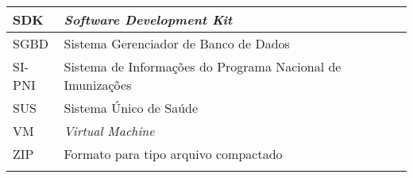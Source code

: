 \begin{center}
\begin{longtable}{ll}
    SDK    & \textit{Software Development Kit} \\ \hline
    SGBD   & Sistema Gerenciador de Banco de Dados \\ \hline
    SI-PNI & Sistema de Informações do Programa Nacional de Imunizações \\ \hline
    SUS    & Sistema Único de Saúde \\ \hline
    VM     & \textit{Virtual Machine} \\ \hline
    ZIP    & Formato para tipo arquivo compactado \\ \hline
  \caption*{}
  \label{tab:abbr}
  \end{longtable}
  
\end{center}